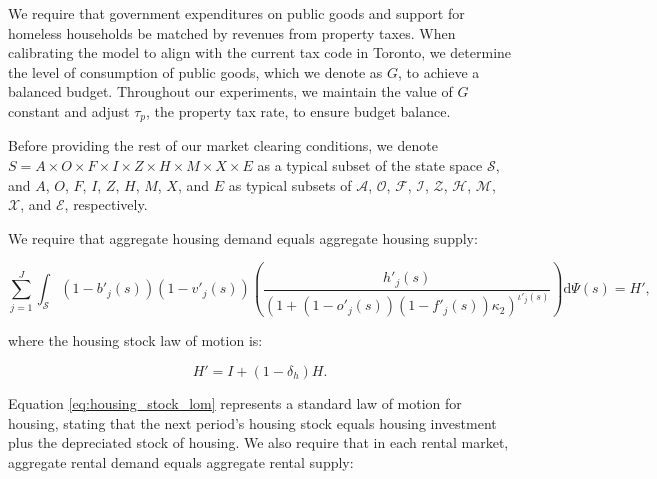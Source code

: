 \documentclass[parskip=full]{article}
\begin{document}
\noindent We require that government expenditures on public goods and support for homeless households be matched by revenues from property taxes. When calibrating the model to align with the current tax code in Toronto, we determine the level of consumption of public goods, which we denote as $G$, to achieve a balanced budget. Throughout our experiments, we maintain the value of $G$ constant and adjust $\tau_{p}$, the property tax rate, to ensure budget balance.%

Before providing the rest of our market clearing conditions, we denote $S=A\times O \times F \times I \times Z \times H\times M\times X \times E$ as a typical subset of the state space $\mathcal{S}$, and $A$, $O$, $F$, $I$, $Z$, $H$, $M$, $X$, and $E$ as typical subsets of $\mathcal{A}$, $\mathcal{O}$, $\mathcal{F}$, $\mathcal{I}$, $\mathcal{Z}$, $\mathcal{H}$, $\mathcal{M}$, $\mathcal{X}$, and $\mathcal{E}$, respectively.

We require that aggregate housing demand equals aggregate housing supply:

\begin{equation}
\label{eq:housing_clearing_condition}
  \sum_{j=1}^J \int_\mathcal{S} (1-b'_{j}(s))(1-v'_{j}(s)) \left(\frac{h'_{j}(s)}{(1+(1-o'_{j}(s))(1-f'_{j}(s))\kappa_{2})^{\iota'_{j}(s)}}\right) \mathrm{d}\Psi(s) = H',
\end{equation}

\noindent where the housing stock law of motion is: 

\begin{equation}\label{eq:housing_stock_lom}
H'=I+(1-\delta_h)H.
\end{equation}

\noindent Equation \eqref{eq:housing_stock_lom} represents a standard law of motion for housing, stating that the next period's housing stock equals housing investment plus the depreciated stock of housing. We also require that in each rental market, aggregate rental demand equals aggregate rental supply:
\end{document}
